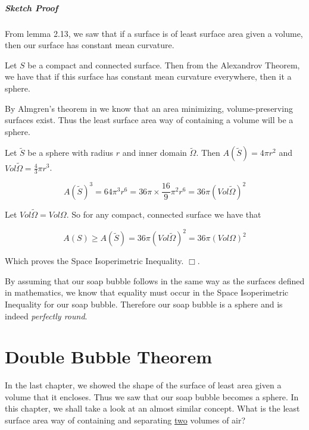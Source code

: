 \documentclass[a4paper,12pt]{report}
\begin{document}
\paragraph{Sketch Proof} 

From lemma 2.13, we saw that if a surface is of least surface area given a volume, then our surface has constant mean curvature.\par
 
Let $S$ be a compact and connected surface. Then from the Alexandrov Theorem, we have that if this surface has constant mean curvature everywhere, then it a sphere.\par 
By Almgren's theorem in \cite{hutchings} we know that an area minimizing, volume-preserving surfaces exist.
Thus the least surface area way of containing a volume will be a sphere.

Let $\tilde{S}$ be a sphere with radius $r$ and inner domain $\tilde{\Omega}$. Then $A(\tilde{S}) = 4\pi r^{2}$ and $Vol \tilde{\Omega} = \frac{4}{3}\pi r^{3}$. 

\[
A(\tilde{S})^{3} = 64\pi^{3} r^{6} = 36\pi \times \frac{16}{9}\pi^{2} r^{6} = 36\pi ( Vol\tilde{\Omega})^{2}
\]

Let $Vol\tilde{\Omega} = Vol\Omega$. So for any compact, connected surface we have that

\[
A(S) \geq A(\tilde{S}) = 36 \pi (Vol \tilde{\Omega})^{2} = 36 \pi (Vol \Omega)^{2}
\]

Which proves the Space Isoperimetric Inequality. \hfill $\Box$.\newline

\hspace{-0.66cm}By assuming that our soap bubble follows in the same way as the surfaces defined in mathematics, we know that equality must occur in the Space Isoperimetric Inequality for our soap bubble. Therefore our soap bubble is a sphere and is indeed \textit{perfectly round}.

\chapter{Double Bubble Theorem}

In the last chapter, we showed the shape of the surface of least area given a volume that it encloses. Thus we saw that our soap bubble becomes a sphere. In this chapter, we shall take a look at an almost similar concept. What is the least surface area way of containing and separating \underline{two} volumes of air?
\end{document}
